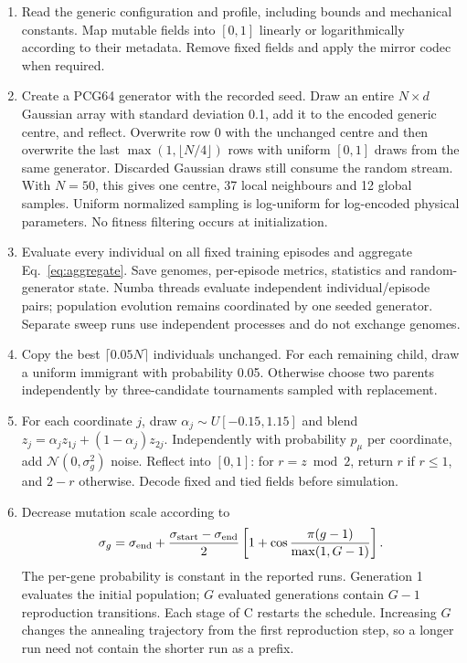 \documentclass{styles/svproc}
\begin{document}
\begin{enumerate}
 \item Read the generic configuration and profile, including bounds and mechanical constants. Map mutable fields into $[0,1]$ linearly or logarithmically according to their metadata. Remove fixed fields and apply the mirror codec when required.
 \item Create a PCG64 generator with the recorded seed. Draw an entire $N\times d$ Gaussian array with standard deviation 0.1, add it to the encoded generic centre, and reflect. Overwrite row 0 with the unchanged centre and then overwrite the last $\max(1,\lfloor N/4\rfloor)$ rows with uniform $[0,1]$ draws from the same generator. Discarded Gaussian draws still consume the random stream. With $N=50$, this gives one centre, 37 local neighbours and 12 global samples. Uniform normalized sampling is log-uniform for log-encoded physical parameters. No fitness filtering occurs at initialization.
 \item Evaluate every individual on all fixed training episodes and aggregate Eq.~\ref{eq:aggregate}. Save genomes, per-episode metrics, statistics and random-generator state. Numba threads evaluate independent individual/episode pairs; population evolution remains coordinated by one seeded generator. Separate sweep runs use independent processes and do not exchange genomes.
 \item Copy the best $\lceil0.05N\rceil$ individuals unchanged. For each remaining child, draw a uniform immigrant with probability 0.05. Otherwise choose two parents independently by three-candidate tournaments sampled with replacement.
 \item For each coordinate $j$, draw $\alpha_j\sim U[-0.15,1.15]$ and blend $z_j=\alpha_jz_{1j}+(1-\alpha_j)z_{2j}$. Independently with probability $p_\mu$ per coordinate, add $\mathcal N(0,\sigma_g^2)$ noise. Reflect into $[0,1]$: for $r=z\bmod2$, return $r$ if $r\le1$, and $2-r$ otherwise. Decode fixed and tied fields before simulation.
 \item Decrease mutation scale according to
 \begin{equation}
  \sigma_g=\sigma_{\rm end}+\frac{\sigma_{\rm start}-\sigma_{\rm end}}2
  \left[1+\cos\frac{\pi(g-1)}{\max(1,G-1)}\right].
  \label{eq:schedule}
 \end{equation}
 The per-gene probability is constant in the reported runs. Generation 1 evaluates the initial population; $G$ evaluated generations contain $G-1$ reproduction transitions. Each stage of C restarts the schedule. Increasing $G$ changes the annealing trajectory from the first reproduction step, so a longer run need not contain the shorter run as a prefix.

\end{enumerate}
\end{document}
